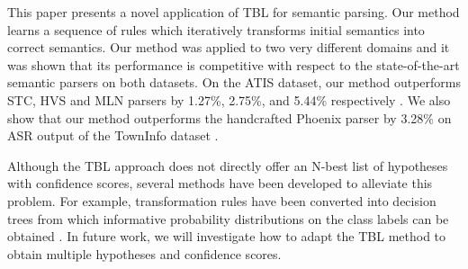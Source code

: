 \documentclass{article}
\begin{document}
This paper presents a novel application of TBL for semantic parsing. Our method learns a sequence of rules which iteratively transforms initial semantics into correct semantics.
Our method was applied to two very different domains and it was shown that its performance is competitive with respect to the state-of-the-art semantic parsers on both datasets. 
On the ATIS dataset, our method outperforms STC, HVS and MLN parsers by 1.27\%, 2.75\%, and 5.44\% respectively \cite{mairesse09,he05,meza08b}. We also show that our method outperforms the handcrafted Phoenix parser by 3.28\% on ASR output of the TownInfo dataset \cite{mairesse09}.

Although the TBL approach does not directly offer an N-best list of hypotheses with confidence scores, several methods have been developed to alleviate this problem. For example, transformation rules have been converted into decision trees from which informative probability distributions on the class labels can be obtained \cite{florian00}. In future work, we will investigate how to adapt the TBL method to obtain multiple hypotheses and confidence scores.


\eightpt


\end{document}
